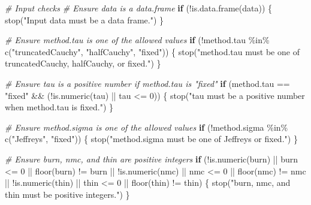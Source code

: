 \documentclass[
  11pt,
]{article}
\newenvironment{Shaded}{}{}
\newcommand{\CommentTok}[1]{\textcolor[rgb]{0.38,0.63,0.69}{\textit{#1}}}
\newcommand{\ControlFlowTok}[1]{\textcolor[rgb]{0.00,0.44,0.13}{\textbf{#1}}}
\newcommand{\DecValTok}[1]{\textcolor[rgb]{0.25,0.63,0.44}{#1}}
\newcommand{\FunctionTok}[1]{\textcolor[rgb]{0.02,0.16,0.49}{#1}}
\newcommand{\NormalTok}[1]{#1}
\newcommand{\SpecialCharTok}[1]{\textcolor[rgb]{0.25,0.44,0.63}{#1}}
\newcommand{\StringTok}[1]{\textcolor[rgb]{0.25,0.44,0.63}{#1}}
\begin{document}
\begin{Shaded}
\begin{Highlighting}[]
  \CommentTok{\# Input checks}
  \CommentTok{\# Ensure data is a data.frame}
  \ControlFlowTok{if}\NormalTok{ (}\SpecialCharTok{!}\FunctionTok{is.data.frame}\NormalTok{(data)) \{}
    \FunctionTok{stop}\NormalTok{(}\StringTok{"Input data must be a data frame."}\NormalTok{)}
\NormalTok{  \}}
  
  \CommentTok{\# Ensure method.tau is one of the allowed values}
  \ControlFlowTok{if}\NormalTok{ (}\SpecialCharTok{!}\NormalTok{method.tau }\SpecialCharTok{\%in\%} \FunctionTok{c}\NormalTok{(}\StringTok{"truncatedCauchy"}\NormalTok{, }\StringTok{"halfCauchy"}\NormalTok{, }\StringTok{"fixed"}\NormalTok{)) \{}
    \FunctionTok{stop}\NormalTok{(}\StringTok{"method.tau must be one of \textquotesingle{}truncatedCauchy\textquotesingle{}, \textquotesingle{}halfCauchy\textquotesingle{}, or \textquotesingle{}fixed\textquotesingle{}."}\NormalTok{)}
\NormalTok{  \}}
  
  \CommentTok{\# Ensure tau is a positive number if method.tau is "fixed"}
  \ControlFlowTok{if}\NormalTok{ (method.tau }\SpecialCharTok{==} \StringTok{"fixed"} \SpecialCharTok{\&\&}\NormalTok{ (}\SpecialCharTok{!}\FunctionTok{is.numeric}\NormalTok{(tau) }\SpecialCharTok{||}\NormalTok{ tau }\SpecialCharTok{\textless{}=} \DecValTok{0}\NormalTok{)) \{}
    \FunctionTok{stop}\NormalTok{(}\StringTok{"tau must be a positive number when method.tau is \textquotesingle{}fixed\textquotesingle{}."}\NormalTok{)}
\NormalTok{  \}}
  
  \CommentTok{\# Ensure method.sigma is one of the allowed values}
  \ControlFlowTok{if}\NormalTok{ (}\SpecialCharTok{!}\NormalTok{method.sigma }\SpecialCharTok{\%in\%} \FunctionTok{c}\NormalTok{(}\StringTok{"Jeffreys"}\NormalTok{, }\StringTok{"fixed"}\NormalTok{)) \{}
    \FunctionTok{stop}\NormalTok{(}\StringTok{"method.sigma must be one of \textquotesingle{}Jeffreys\textquotesingle{} or \textquotesingle{}fixed\textquotesingle{}."}\NormalTok{)}
\NormalTok{  \}}
  
  \CommentTok{\# Ensure burn, nmc, and thin are positive integers}
  \ControlFlowTok{if}\NormalTok{ (}\SpecialCharTok{!}\FunctionTok{is.numeric}\NormalTok{(burn) }\SpecialCharTok{||}\NormalTok{ burn }\SpecialCharTok{\textless{}=} \DecValTok{0} \SpecialCharTok{||} \FunctionTok{floor}\NormalTok{(burn) }\SpecialCharTok{!=}\NormalTok{ burn }\SpecialCharTok{||}
      \SpecialCharTok{!}\FunctionTok{is.numeric}\NormalTok{(nmc) }\SpecialCharTok{||}\NormalTok{ nmc }\SpecialCharTok{\textless{}=} \DecValTok{0} \SpecialCharTok{||} \FunctionTok{floor}\NormalTok{(nmc) }\SpecialCharTok{!=}\NormalTok{ nmc }\SpecialCharTok{||}
      \SpecialCharTok{!}\FunctionTok{is.numeric}\NormalTok{(thin) }\SpecialCharTok{||}\NormalTok{ thin }\SpecialCharTok{\textless{}=} \DecValTok{0} \SpecialCharTok{||} \FunctionTok{floor}\NormalTok{(thin) }\SpecialCharTok{!=}\NormalTok{ thin) \{}
    \FunctionTok{stop}\NormalTok{(}\StringTok{"burn, nmc, and thin must be positive integers."}\NormalTok{)}
\NormalTok{  \}}
  

\end{Highlighting}
\end{Shaded}
\end{document}
